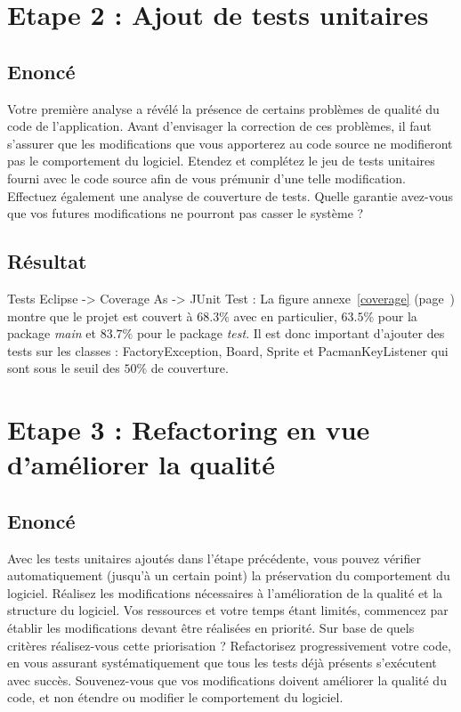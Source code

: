\documentclass[12pt,a4paper,final]{article}
\newcommand{\annexe}[1]{annexe~\ref{#1} (page~\pageref{#1})}
\begin{document}
\newpage
\section{Etape 2 : Ajout de tests unitaires}\label{sec:etape2}
\subsection{Enoncé}
Votre première analyse a révélé la présence de certains problèmes de qualité du code de l'application.
Avant d'envisager la correction de ces problèmes, il faut s'assurer que les modifications que vous apporterez au code source ne modifieront pas le comportement du logiciel.
Etendez et complétez le jeu de tests unitaires fourni avec le code source afin de vous prémunir d'une telle modification. Effectuez également une analyse de couverture de tests.
Quelle garantie avez-vous que vos futures modifications ne pourront pas casser le système ?

\subsection{Résultat}

Tests  Eclipse -> Coverage As -> JUnit Test : La figure \annexe{coverage} montre que le projet est couvert à $68.3 \%$ avec en particulier, $63.5\%$ pour la package \emph{main} et $83.7\%$ pour le package \emph{test}.
 Il est donc important d'ajouter des tests sur les classes : FactoryException, Board, Sprite et PacmanKeyListener qui sont sous le seuil des $50 \%$ de couverture.

\newpage
\section{Etape 3 : Refactoring en vue d'améliorer la qualité}\label{sec:etape3}
\subsection{Enoncé}
Avec les tests unitaires ajoutés dans l'étape précédente, vous pouvez vérifier automatiquement (jusqu'à un certain point) la préservation du comportement du logiciel. Réalisez les modifications nécessaires à l'amélioration de la qualité et la structure du logiciel. 
Vos ressources et votre temps étant limités, commencez par établir les modifications devant être réalisées en priorité. Sur base de quels critères réalisez-vous cette priorisation ?
Refactorisez progressivement votre code, en vous assurant systématiquement que tous les tests déjà présents s'exécutent avec succès. Souvenez-vous que vos modifications doivent améliorer la qualité du code, et non étendre ou modifier le comportement du logiciel.
\end{document}
